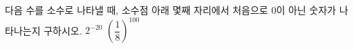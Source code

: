 다음 수를 소수로 나타낼 때, 소수점 아래 몇째 자리에서 처음으로 $0$이 아닌 숫자가 나타나는지 구하시오. 
 $2^{-20}$
 $\left(\dfrac{1}{8}\right)^{100}$
